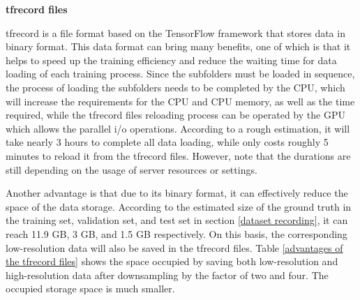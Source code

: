 \begin{spacing}{1.5}
\textbf{\large{\gls{tfrecord} files}}
\end{spacing}

\gls{tfrecord} is a file format based on the TensorFlow framework that stores data in binary format. This data format can bring many benefits, one of which is that it helps to speed up the training efficiency and reduce the waiting time for data loading of each training process. Since the subfolders must be loaded in sequence, the process of loading the subfolders needs to be completed by the CPU, which will increase the requirements for the CPU and CPU memory, as well as the time required, while the \gls{tfrecord} files reloading process can be operated by the GPU which allows the parallel \gls{i/o} operations. According to a rough estimation, it will take nearly 3 hours to complete all data loading, while only costs roughly 5 minutes to reload it from the \gls{tfrecord} files. However, note that the durations are still depending on the usage of server resources or settings.

Another advantage is that due to its binary format, it can effectively reduce the space of the data storage. According to the estimated size of the ground truth in the training set, validation set, and test set in section \ref{dataset recording}, it can reach 11.9 GB, 3 GB, and 1.5 GB respectively. On this basis, the corresponding low-resolution data will also be saved in the \gls{tfrecord} files. Table \ref{advantages of the tfrecord files} shows the space occupied by saving both low-resolution and high-resolution data after downsampling by the factor of two and four. The occupied storage space is much smaller.

